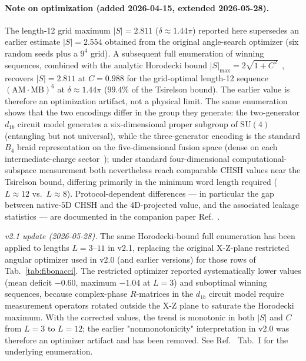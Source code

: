 \documentclass[aps,pra,twocolumn,superscriptaddress,showpacs,floatfix]{revtex4-2}
\begin{document}
\paragraph{Note on optimization (added 2026-04-15, extended 2026-05-28).}
The length-12 grid maximum $|S| = 2.811$ ($\delta \approx 1.44\pi$) reported
here supersedes an earlier estimate
$|S| = 2.554$ obtained from the original angle-search optimizer (six random
seeds plus a $9^4$ grid). A subsequent full enumeration of winning sequences,
combined with the analytic Horodecki bound
$|S|_{\max} = 2\sqrt{1+C^2}$~\cite{Horodecki1995}, recovers $|S| = 2.811$ at
$C = 0.988$ for the grid-optimal length-12 sequence
$(\text{AM}\cdot\text{MB})^6$ at
$\delta\approx1.44\pi$ ($99.4\%$ of the Tsirelson bound).
The earlier value is therefore an optimization artifact, not a physical limit.
The same enumeration shows that the two encodings differ in the group they
generate: the two-generator $d_{1b}$ circuit model generates a six-dimensional
proper subgroup of $\mathrm{SU}(4)$ (entangling but not universal), while the
three-generator encoding is the standard $B_4$ braid representation on the
five-dimensional fusion space (dense on each intermediate-charge
sector~\cite{Bonesteel2005}); under standard four-dimensional
computational-subspace measurement both nevertheless reach comparable CHSH
values near the Tsirelson bound, differing primarily in the minimum word length
required ($L \approx 12$ vs.\ $L \approx 8$).
Protocol-dependent differences --- in particular the gap between native-$5$D
CHSH and the $4$D-projected value, and the associated leakage statistics ---
are documented in the companion paper
Ref.~\cite{Sayim2026fibonacci}.

\smallskip
\textit{v2.1 update (2026-05-28).}
The same Horodecki-bound full enumeration has been applied to lengths
$L = 3$--$11$ in v2.1, replacing the original X-Z-plane restricted angular
optimizer used in v2.0 (and earlier versions) for those rows of
Tab.~\ref{tab:fibonacci}.  The restricted optimizer reported systematically
lower values (mean deficit ${-}0.60$, maximum ${-}1.04$ at $L = 3$) and
suboptimal winning sequences, because complex-phase $R$-matrices in the
$d_{1b}$ circuit model require measurement operators rotated outside the X-Z
plane to saturate the Horodecki maximum.  With the corrected values, the trend
is monotonic in both $|S|$ and $C$ from $L=3$ to $L=12$; the earlier
"nonmonotonicity" interpretation in v2.0 was therefore an optimizer artifact
and has been removed.  See Ref.~\cite{Sayim2026fibonacci} Tab.~I for the underlying
enumeration.
\end{document}
